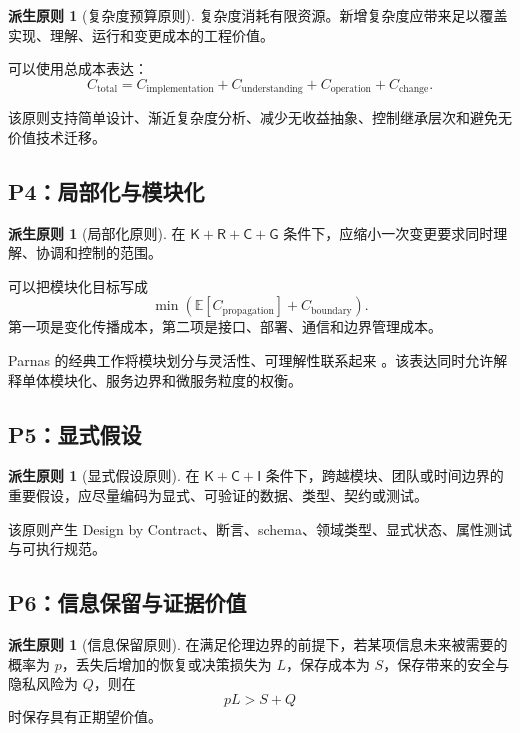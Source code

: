 \documentclass[11pt,a4paper]{ctexart}
\numberwithin{equation}{section}
\theoremstyle{definition}
\newtheorem{principle}[definition]{派生原则}
\theoremstyle{plain}
\newcommand{\Know}{\mathsf{K}}
\newcommand{\Res}{\mathsf{R}}
\newcommand{\Ctrl}{\mathsf{C}}
\newcommand{\Info}{\mathsf{I}}
\newcommand{\Goal}{\mathsf{G}}
\begin{document}
\begin{principle}[复杂度预算原则]
复杂度消耗有限资源。新增复杂度应带来足以覆盖实现、理解、运行和变更成本的工程价值。
\end{principle}

可以使用总成本表达：
\[
C_{\mathrm{total}}
=
C_{\mathrm{implementation}}
+
C_{\mathrm{understanding}}
+
C_{\mathrm{operation}}
+
C_{\mathrm{change}}.
\]

该原则支持简单设计、渐近复杂度分析、减少无收益抽象、控制继承层次和避免无价值技术迁移。

\subsection{P4：局部化与模块化}

\begin{principle}[局部化原则]
在 $\Know+\Res+\Ctrl+\Goal$ 条件下，应缩小一次变更要求同时理解、协调和控制的范围。
\end{principle}

可以把模块化目标写成
\[
\min
\left(
\mathbb{E}[C_{\mathrm{propagation}}]
+
C_{\mathrm{boundary}}
\right).
\]
第一项是变化传播成本，第二项是接口、部署、通信和边界管理成本。

Parnas 的经典工作将模块划分与灵活性、可理解性联系起来 \cite{parnas1972}。该表达同时允许解释单体模块化、服务边界和微服务粒度的权衡。

\subsection{P5：显式假设}

\begin{principle}[显式假设原则]
在 $\Know+\Ctrl+\Info$ 条件下，跨越模块、团队或时间边界的重要假设，应尽量编码为显式、可验证的数据、类型、契约或测试。
\end{principle}

该原则产生 Design by Contract、断言、schema、领域类型、显式状态、属性测试与可执行规范。

\subsection{P6：信息保留与证据价值}

\begin{principle}[信息保留原则]
在满足伦理边界的前提下，若某项信息未来被需要的概率为 $p$，丢失后增加的恢复或决策损失为 $L$，保存成本为 $S$，保存带来的安全与隐私风险为 $Q$，则在
\[
pL>S+Q
\]
时保存具有正期望价值。
\end{principle}
\end{document}
